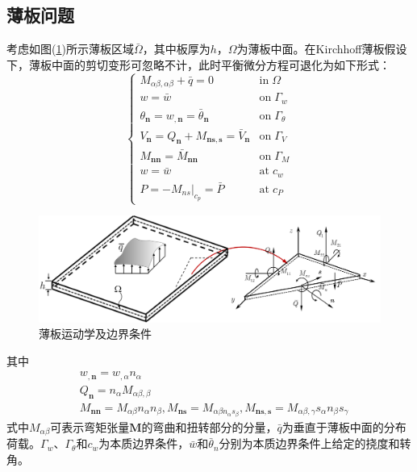\subsection{薄板问题}
考虑如图(\ref{plate})所示薄板区域$\bar \Omega$，其中板厚为$h$，$\Omega$为薄板中面。在Kirchhoff薄板假设下\cite{Liu}，薄板中面的剪切变形可忽略不计，此时平衡微分方程可退化为如下形式：
\begin{equation}
    \begin{cases}\label{P control equation}
        M_{\alpha\beta,\alpha\beta}+\bar q=0&\mathrm{in} \; \Omega\\
        w=\bar w&\mathrm{on}\;\Gamma_w\\
        \theta_{\pmb n}=w_{,\pmb n}=\bar \theta_{\pmb n}&\mathrm{on}\;\Gamma_{\theta}\\
        V_{\pmb n}=Q_{\pmb n}+M_{\pmb{ns},\pmb s}=\bar V_{\pmb n}&\mathrm{on}\;\Gamma_V\\
        M_{\pmb{nn}}=\bar M_{\pmb{nn}}&\mathrm{on}\; \Gamma_M\\
        w=\bar w&\mathrm{at} \; c_w\\
        P=-\left .M_{ns} \right \vert_{c_p}=\bar P&\mathrm{at}\; c_P
    \end{cases}
\end{equation}
\begin{figure}[H]
    \centering
    \includegraphics[scale=0.7]{figure/nomesh/plate.png}
    \caption{薄板运动学及边界条件}\label{plate}
\end{figure}
\noindent
其中
\begin{subequations}
\begin{align}
\label{wn} &w_{,\pmb n}=w_{,\alpha}n_{\alpha}\\
\label{Qn} &Q_{\pmb n}=n_{\alpha}M_{\alpha\beta,\beta}\\
\label{Mn} &M_{\pmb{nn}}=M_{\alpha\beta}n_{\alpha}n_{\beta},M_{\pmb{ns}}=M_{\alpha\beta n_{\alpha}s_{\beta}},M_{\pmb{ns,s}}=M_{\alpha\beta,\gamma}s_{\alpha}n_{\beta}s_{\gamma}
\end{align}
\end{subequations}
式中$M_{\alpha\beta}$可表示弯矩张量$\boldsymbol M$的弯曲和扭转部分的分量，$\bar q$为垂直于薄板中面的分布荷载。$\Gamma_w$、$\Gamma_{\theta}$和$c_w$为本质边界条件，$\bar w$和$\bar \theta_n$分别为本质边界条件上给定的挠度和转角。
